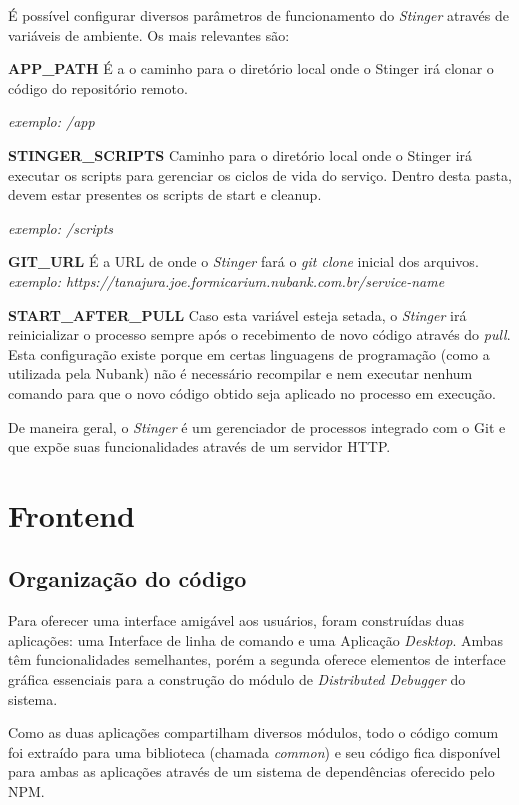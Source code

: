 \documentclass[]{politex}
\begin{document}
	É possível configurar diversos parâmetros de funcionamento do \textit{Stinger} através de variáveis de ambiente. Os mais relevantes são:
	
	\textbf{APP\_PATH}
	\newline
	É a o caminho para o diretório local onde o Stinger irá clonar o código do repositório remoto.
	
	\textit{exemplo: /app}

	\textbf{STINGER\_SCRIPTS}
	\newline
	Caminho para o diretório local onde o Stinger irá executar os scripts para gerenciar os ciclos de vida do serviço. Dentro desta pasta, devem estar presentes os scripts de start e cleanup.
	
	\textit{exemplo: /scripts}
	
	\textbf{GIT\_URL}
	\newline
	É a URL de onde o \textit{Stinger} fará o \textit{git clone} inicial dos arquivos.
	\textit{exemplo: https://tanajura.joe.formicarium.nubank.com.br/service-name}
	
	\textbf{START\_AFTER\_PULL}
	\newline
	Caso esta variável esteja setada, o \textit{Stinger} irá reinicializar o processo sempre após o recebimento de novo código através do \textit{pull}. Esta configuração existe porque em certas linguagens de programação (como a utilizada pela Nubank) não é necessário recompilar e nem executar nenhum comando para que o novo código obtido seja aplicado no processo em execução.
    
	De maneira geral, o \textit{Stinger} é um gerenciador de processos integrado com o Git e que expõe suas funcionalidades através de um servidor HTTP.

\section{Frontend}
\subsection{Organização do código}
Para oferecer uma interface amigável aos usuários, foram construídas duas aplicações: uma Interface de linha de comando e uma Aplicação \textit{Desktop}. Ambas têm funcionalidades semelhantes, porém a segunda oferece elementos de interface gráfica essenciais para a construção do módulo de \textit{Distributed Debugger} do sistema.

Como as duas aplicações compartilham diversos módulos, todo o código comum foi extraído para uma biblioteca (chamada \textit{common}) e seu código fica disponível para ambas as aplicações através de um sistema de dependências oferecido pelo NPM.
\end{document}
